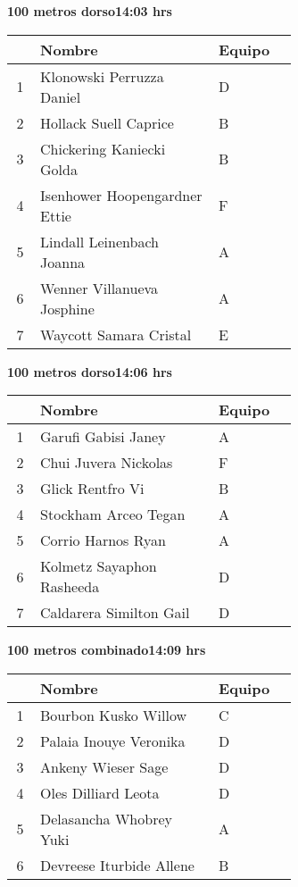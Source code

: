 \begin{minipage}{0.95\linewidth}
\begin{center}
\textbf{
100 metros dorso\hspace{1cm}14:03 hrs}
\end{center}
\begin{tabular}{cp{0.63\linewidth}l}
\hline
& \textbf{Nombre} & \textbf{Equipo} \\ \hline
1 & Klonowski Perruzza Daniel & D \\ 
2 & Hollack Suell Caprice & B \\ 
3 & Chickering Kaniecki Golda & B \\ 
4 & Isenhower Hoopengardner Ettie & F \\ 
5 & Lindall Leinenbach Joanna & A \\ 
6 & Wenner Villanueva Josphine & A \\ 
7 & Waycott Samara Cristal & E \\ 
\end{tabular}
\end{minipage}
\begin{minipage}{0.95\linewidth}
\begin{center}
\textbf{
100 metros dorso\hspace{1cm}14:06 hrs}
\end{center}
\begin{tabular}{cp{0.63\linewidth}l}
\hline
& \textbf{Nombre} & \textbf{Equipo} \\ \hline
1 & Garufi Gabisi Janey & A \\ 
2 & Chui Juvera Nickolas & F \\ 
3 & Glick Rentfro Vi & B \\ 
4 & Stockham Arceo Tegan & A \\ 
5 & Corrio Harnos Ryan & A \\ 
6 & Kolmetz Sayaphon Rasheeda & D \\ 
7 & Caldarera Similton Gail & D \\ 
\end{tabular}
\end{minipage}
\begin{minipage}{0.95\linewidth}
\begin{center}
\textbf{
100 metros combinado\hspace{1cm}14:09 hrs}
\end{center}
\begin{tabular}{cp{0.63\linewidth}l}
\hline
& \textbf{Nombre} & \textbf{Equipo} \\ \hline
1 & Bourbon Kusko Willow & C \\ 
2 & Palaia Inouye Veronika & D \\ 
3 & Ankeny Wieser Sage & D \\ 
4 & Oles Dilliard Leota & D \\ 
5 & Delasancha Whobrey Yuki & A \\ 
6 & Devreese Iturbide Allene & B \\ 
\end{tabular}
\end{minipage}
